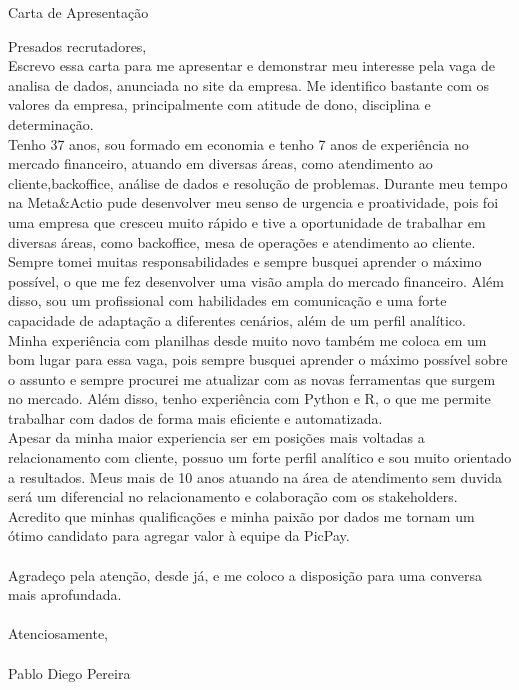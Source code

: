 \documentclass{resume}
\begin{document}
\begin{rSection}{Carta de Apresentação}
{
    Presados recrutadores,
    \vspace{0.5em}\\
    Escrevo essa carta para me apresentar e demonstrar meu interesse pela vaga de analisa de dados, anunciada no site da empresa. Me identifico bastante com os valores da empresa, principalmente com atitude de dono, disciplina e determinação.\vspace{0.5em}\\
     Tenho 37 anos, sou formado em economia e tenho 7 anos de experiência no mercado financeiro, atuando em diversas áreas, como atendimento ao cliente,backoffice, análise de dados e resolução de problemas. Durante meu tempo na Meta\&Actio pude desenvolver meu senso de urgencia e proatividade, pois foi uma empresa que cresceu muito rápido e tive a oportunidade de trabalhar em diversas áreas, como backoffice, mesa de operações e atendimento ao cliente. Sempre tomei muitas responsabilidades e sempre busquei aprender o máximo possível, o que me fez desenvolver uma visão ampla do mercado financeiro. Além disso, sou um profissional com habilidades em comunicação e uma forte capacidade de adaptação a diferentes cenários, além de um perfil analítico.\vspace{0.5em}\\
     Minha experiência com planilhas desde muito novo também me coloca em um bom lugar para essa vaga, pois sempre busquei aprender o máximo possível sobre o assunto e sempre procurei me atualizar com as novas ferramentas que surgem no mercado. Além disso, tenho experiência com Python e R, o que me permite trabalhar com dados de forma mais eficiente e automatizada.\vspace{0.5em}\\
     Apesar da minha maior experiencia ser em posições mais voltadas a relacionamento com cliente, possuo um forte perfil analítico e sou muito orientado a resultados. Meus mais de 10 anos atuando na área de atendimento sem duvida será um diferencial no relacionamento e colaboração com os stakeholders.\vspace{0.5em}\\
     Acredito que minhas qualificações e minha paixão por dados me tornam um ótimo candidato para agregar valor à equipe da PicPay.\vspace{0.5em}\\ \\
     Agradeço pela atenção, desde já, e me coloco a disposição para uma conversa mais aprofundada.\vspace{0.5em}\\  \\  Atenciosamente,\vspace{0.5em}\\ \\
    Pablo Diego Pereira

}
\end{rSection}
\end{document}
